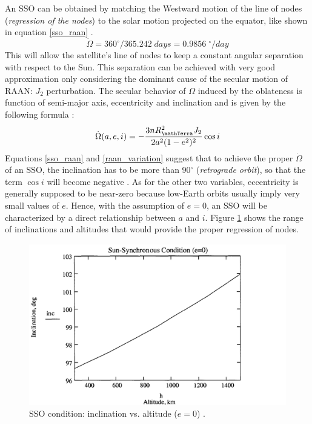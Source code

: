 An SSO can be obtained by matching the Westward motion of the line of nodes (\textit{regression of the nodes}) to the solar motion projected on the equator, like shown in equation \ref{sso_raan} \cite{brown1998spacecraft}.
\begin{equation} \label{sso_raan}
    \dot{\Omega} = 360^{\circ} / 365.242\;days = 0.9856\;^{\circ}/day 
\end{equation}
This will allow the satellite's line of nodes to keep a constant angular separation with respect to the Sun.
This separation can be achieved with very good approximation only considering the dominant cause of the secular motion of RAAN: $J_2$ perturbation.  
The secular behavior of $\Omega$ induced by the oblateness is function of semi-major axis, eccentricity and inclination and is given by the following formula \cite{vallado2013fundamentals}:
\begin{equation} \label{raan_variation}
    \dot{\Omega}(a,e,i) = - \frac{3n R_{\mathTerra}^2 J_2}{2a^2 (1-e^2)^2} \cos{i}
\end{equation}
Equations \ref{sso_raan} and \ref{raan_variation} suggest that to achieve the proper $\dot{\Omega}$ of an SSO, the inclination has to be more than 90$^\circ$ (\textit{retrograde orbit}), so that the term $\cos{i}$ will become negative \cite{wertz2009orbit}.
As for the other two variables, eccentricity is generally supposed to be near-zero because low-Earth orbits usually imply very small values of $e$.
Hence, with the assumption of $e=0$, an SSO will be characterized by a direct relationship between $a$ and $i$.
Figure \ref{inc_h_sso} shows the range of inclinations and altitudes that would provide the proper regression of nodes.
\begin{figure}[h]
    \centering
    \includegraphics[scale=0.5]{img/inc_vs_h_sso.png}
    \caption{SSO condition: inclination vs. altitude ($e=0$) \cite{brown1998spacecraft}.}
    \label{inc_h_sso}
\end{figure}

